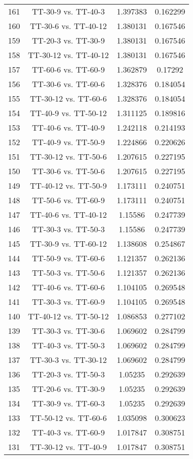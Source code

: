 \documentclass[a4paper,10pt]{article}
\begin{document}
\begin{landscape}
\begin{table}[!htp]
\begin{tabular}{cccc}
161&TT-30-9 vs. TT-40-3&1.397383&0.162299\\
160&TT-30-6 vs. TT-40-12&1.380131&0.167546\\
159&TT-20-3 vs. TT-30-9&1.380131&0.167546\\
158&TT-30-12 vs. TT-40-12&1.380131&0.167546\\
157&TT-60-6 vs. TT-60-9&1.362879&0.17292\\
156&TT-30-6 vs. TT-60-6&1.328376&0.184054\\
155&TT-30-12 vs. TT-60-6&1.328376&0.184054\\
154&TT-40-9 vs. TT-50-12&1.311125&0.189816\\
153&TT-40-6 vs. TT-40-9&1.242118&0.214193\\
152&TT-40-9 vs. TT-50-9&1.224866&0.220626\\
151&TT-30-12 vs. TT-50-6&1.207615&0.227195\\
150&TT-30-6 vs. TT-50-6&1.207615&0.227195\\
149&TT-40-12 vs. TT-50-9&1.173111&0.240751\\
148&TT-50-6 vs. TT-60-9&1.173111&0.240751\\
147&TT-40-6 vs. TT-40-12&1.15586&0.247739\\
146&TT-30-3 vs. TT-50-3&1.15586&0.247739\\
145&TT-30-9 vs. TT-60-12&1.138608&0.254867\\
144&TT-50-9 vs. TT-60-6&1.121357&0.262136\\
143&TT-50-3 vs. TT-50-6&1.121357&0.262136\\
142&TT-40-6 vs. TT-60-6&1.104105&0.269548\\
141&TT-30-3 vs. TT-60-9&1.104105&0.269548\\
140&TT-40-12 vs. TT-50-12&1.086853&0.277102\\
139&TT-30-3 vs. TT-30-6&1.069602&0.284799\\
138&TT-40-3 vs. TT-50-3&1.069602&0.284799\\
137&TT-30-3 vs. TT-30-12&1.069602&0.284799\\
136&TT-20-3 vs. TT-50-3&1.05235&0.292639\\
135&TT-20-6 vs. TT-30-9&1.05235&0.292639\\
134&TT-30-9 vs. TT-60-3&1.05235&0.292639\\
133&TT-50-12 vs. TT-60-6&1.035098&0.300623\\
132&TT-40-3 vs. TT-60-9&1.017847&0.308751\\
131&TT-30-12 vs. TT-40-9&1.017847&0.308751\\

\end{tabular}
\end{table}
\end{landscape}
\end{document}
